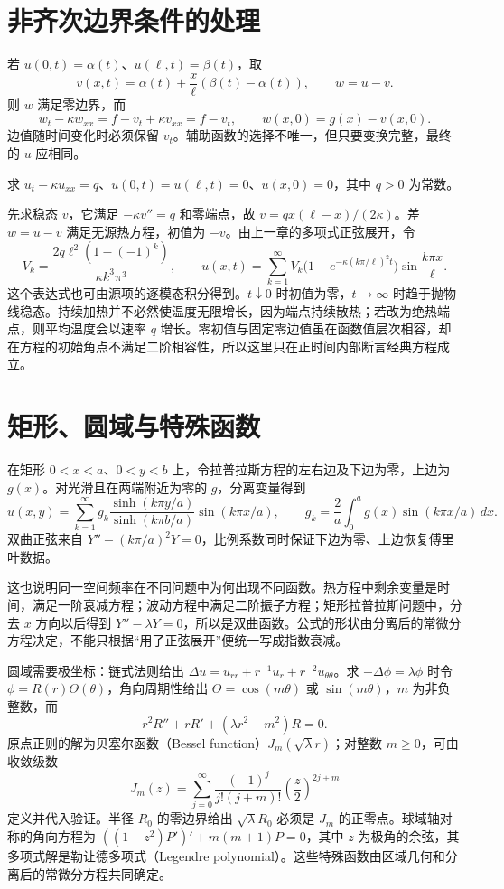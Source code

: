 \section{非齐次边界条件的处理}
若 $u(0,t)=\alpha(t)$、$u(\ell,t)=\beta(t)$，取
\[
 v(x,t)=\alpha(t)+\frac{x}{\ell}(\beta(t)-\alpha(t)),\qquad w=u-v.
\]
则 $w$ 满足零边界，而
\[
 w_t-\kappa w_{xx}=f-v_t+\kappa v_{xx}=f-v_t,\qquad
 w(x,0)=g(x)-v(x,0).
\]
边值随时间变化时必须保留 $v_t$。辅助函数的选择不唯一，但只要变换完整，最终的 $u$ 应相同。

\begin{example}[均匀加热的杆]
求 $u_t-\kappa u_{xx}=q$、$u(0,t)=u(\ell,t)=0$、$u(x,0)=0$，其中 $q>0$ 为常数。
\end{example}
\begin{solve}
先求稳态 $v$，它满足 $-\kappa v''=q$ 和零端点，故 $v=q x(\ell-x)/(2\kappa)$。差 $w=u-v$ 满足无源热方程，初值为 $-v$。由上一章的多项式正弦展开，令
\[
 V_k=\frac{2q\ell^2(1-(-1)^k)}{\kappa k^3\pi^3},
 \qquad
 u(x,t)=\sum_{k=1}^\infty V_k
 \bigl(1-e^{-\kappa(k\pi/\ell)^2t}\bigr)\sin\frac{k\pi x}{\ell}.
\]
这个表达式也可由源项的逐模态积分得到。$t\downarrow0$ 时初值为零，$t\to\infty$ 时趋于抛物线稳态。持续加热并不必然使温度无限增长，因为端点持续散热；若改为绝热端点，则平均温度会以速率 $q$ 增长。零初值与固定零边值虽在函数值层次相容，却在方程的初始角点不满足二阶相容性，所以这里只在正时间内部断言经典方程成立。
\end{solve}

\section{矩形、圆域与特殊函数}
在矩形 $0<x<a$、$0<y<b$ 上，令拉普拉斯方程的左右边及下边为零，上边为 $g(x)$。对光滑且在两端附近为零的 $g$，分离变量得到
\begin{equation}
 u(x,y)=\sum_{k=1}^\infty g_k
 \frac{\sinh(k\pi y/a)}{\sinh(k\pi b/a)}\sin(k\pi x/a),
 \qquad g_k=\frac2a\int_0^a g(x)\sin(k\pi x/a)\,dx.
 \label{eq:rectangle-laplace}
\end{equation}
双曲正弦来自 $Y''-(k\pi/a)^2Y=0$，比例系数同时保证下边为零、上边恢复傅里叶数据。

这也说明同一空间频率在不同问题中为何出现不同函数。热方程中剩余变量是时间，满足一阶衰减方程；波动方程中满足二阶振子方程；矩形拉普拉斯问题中，分去 $x$ 方向以后得到 $Y''-\lambda Y=0$，所以是双曲函数。公式的形状由分离后的常微分方程决定，不能只根据“用了正弦展开”便统一写成指数衰减。

圆域需要极坐标：链式法则给出 $\Delta u=u_{rr}+r^{-1}u_r+r^{-2}u_{\theta\theta}$。求 $-\Delta\phi=\lambda\phi$ 时令 $\phi=R(r)\Theta(\theta)$，角向周期性给出 $\Theta=\cos(m\theta)$ 或 $\sin(m\theta)$，$m$ 为非负整数，而
\[
 r^2R''+rR'+(\lambda r^2-m^2)R=0.
\]
原点正则的解为贝塞尔函数（Bessel function）$J_m(\sqrt\lambda r)$；对整数 $m\ge0$，可由收敛级数
\[
 J_m(z)=\sum_{j=0}^\infty\frac{(-1)^j}{j!(j+m)!}\left(\frac z2\right)^{2j+m}
\]
定义并代入验证。半径 $R_0$ 的零边界给出 $\sqrt\lambda R_0$ 必须是 $J_m$ 的正零点。球域轴对称的角向方程为 $((1-z^2)P')'+m(m+1)P=0$，其中 $z$ 为极角的余弦，其多项式解是勒让德多项式（Legendre polynomial）。这些特殊函数由区域几何和分离后的常微分方程共同确定。

